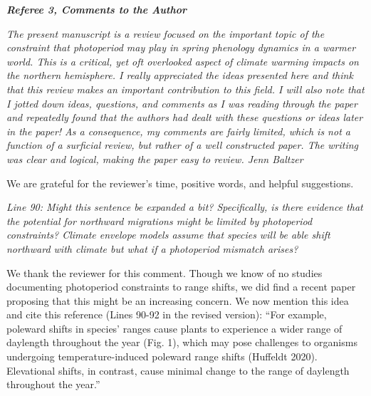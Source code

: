\documentclass{article}
\begin{document}
\emph{{\bf Referee 3, Comments to the Author}}
\par \emph{The present manuscript is a review focused on the important topic of the constraint that photoperiod may play in spring phenology dynamics in a warmer world. This is a critical, yet oft overlooked aspect of climate warming impacts on the northern hemisphere. I really appreciated the ideas presented here and think that this review makes an important contribution to this field. I will also note that I jotted down ideas, questions, and comments as I was reading through the paper and repeatedly found that the authors had dealt with these questions or ideas later in the paper! As a consequence, my comments are fairly limited, which is not a function of a surficial review, but rather of a well constructed paper. The writing was clear and logical, making the paper easy to review. Jenn Baltzer}
\par We are grateful for the reviewer's time, positive words, and helpful suggestions.

\par \emph{Line 90: Might this sentence be expanded a bit? Specifically, is there evidence that the potential for northward migrations might be limited by photoperiod constraints? Climate envelope models assume that species will be able shift northward with climate but what if a photoperiod mismatch arises? }
\par We thank the reviewer for this comment. Though we know of no studies documenting photoperiod constraints to range shifts, we did find a recent paper proposing that this might be an increasing concern. We now mention this idea and cite this reference (Lines 90-92 in the revised version):
``For example, poleward shifts in species' ranges cause plants to experience a wider range of daylength throughout the year (Fig. 1), which may pose challenges to organisms undergoing temperature-induced poleward range shifts (Huffeldt 2020). Elevational shifts, in contrast, cause minimal change to the range of daylength throughout the year.''
\end{document}
